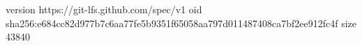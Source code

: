 version https://git-lfs.github.com/spec/v1
oid sha256:e684cc82d977b7c6aa77fe5b9351f65058aa797d011487408ca7bf2ee912fc4f
size 43840
